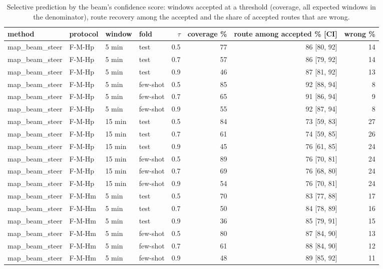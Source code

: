\begin{table}[t]\centering\scriptsize\setlength{\tabcolsep}{3pt}
\caption{Selective prediction by the beam's confidence score: windows accepted at a threshold (coverage, all expected windows in the denominator), route recovery among the accepted and the share of accepted routes that are wrong.}\label{tab:supp_conf_thr}
\begin{tabular}{llllrrrr}\toprule
method & protocol & window & fold & $\tau$ & coverage \% & route among accepted \% [CI] & wrong \% \\\midrule
map\_beam\_steer & F-M-Hp & 5 min & test & 0.5 & 77 & 86 [80, 92] & 14 \\
map\_beam\_steer & F-M-Hp & 5 min & test & 0.7 & 57 & 86 [79, 92] & 14 \\
map\_beam\_steer & F-M-Hp & 5 min & test & 0.9 & 46 & 87 [81, 92] & 13 \\
map\_beam\_steer & F-M-Hp & 5 min & few-shot & 0.5 & 85 & 92 [88, 94] & 8 \\
map\_beam\_steer & F-M-Hp & 5 min & few-shot & 0.7 & 65 & 91 [86, 94] & 9 \\
map\_beam\_steer & F-M-Hp & 5 min & few-shot & 0.9 & 55 & 92 [87, 94] & 8 \\
map\_beam\_steer & F-M-Hp & 15 min & test & 0.5 & 84 & 73 [59, 83] & 27 \\
map\_beam\_steer & F-M-Hp & 15 min & test & 0.7 & 61 & 74 [59, 85] & 26 \\
map\_beam\_steer & F-M-Hp & 15 min & test & 0.9 & 45 & 76 [61, 85] & 24 \\
map\_beam\_steer & F-M-Hp & 15 min & few-shot & 0.5 & 89 & 76 [70, 81] & 24 \\
map\_beam\_steer & F-M-Hp & 15 min & few-shot & 0.7 & 69 & 76 [68, 80] & 24 \\
map\_beam\_steer & F-M-Hp & 15 min & few-shot & 0.9 & 54 & 76 [70, 81] & 24 \\
map\_beam\_steer & F-M-Hm & 5 min & test & 0.5 & 70 & 83 [77, 88] & 17 \\
map\_beam\_steer & F-M-Hm & 5 min & test & 0.7 & 50 & 84 [78, 89] & 16 \\
map\_beam\_steer & F-M-Hm & 5 min & test & 0.9 & 36 & 85 [79, 91] & 15 \\
map\_beam\_steer & F-M-Hm & 5 min & few-shot & 0.5 & 80 & 87 [84, 90] & 13 \\
map\_beam\_steer & F-M-Hm & 5 min & few-shot & 0.7 & 61 & 88 [84, 90] & 12 \\
map\_beam\_steer & F-M-Hm & 5 min & few-shot & 0.9 & 48 & 89 [85, 92] & 11 \\

\end{tabular}
\end{table}
